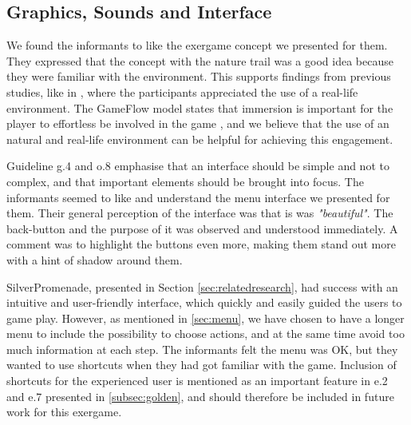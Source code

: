 \subsection{Graphics, Sounds and Interface}

We found the informants to like the exergame concept we presented for them. They expressed that the concept with the nature trail was a good idea because they were familiar with the environment. This supports findings from previous studies, like in \cite{gerling2}, where the participants appreciated the use of a real-life environment. The GameFlow model states that immersion is important for the player to effortless be involved in the game \cite{sweetser}, and we believe that the use of an natural and real-life environment can be helpful for achieving this engagement. 

Guideline g.4 and o.8 emphasise that an interface should be simple and not to complex, and that important elements should be brought into focus. The informants seemed to like and understand the menu interface we presented for them. Their general perception of the interface was that is was \emph{"beautiful"}. The back-button and the purpose of it was observed and understood immediately. A comment was to highlight the buttons even more, making them stand out more with a hint of shadow around them. 

SilverPromenade, presented in Section \ref{sec:relatedresearch}, had success with an intuitive and user-friendly interface, which quickly and easily guided the users to game play. However, as mentioned in \ref{sec:menu}, we have chosen to have a longer menu to include the possibility to choose actions, and at the same time avoid too much information at each step. The informants felt the menu was OK, but they wanted to use shortcuts when they had got familiar with the game. Inclusion of shortcuts for the experienced user is mentioned as an important feature in e.2 and e.7 presented in \ref{subsec:golden}, and should therefore be included in future work for this exergame.

